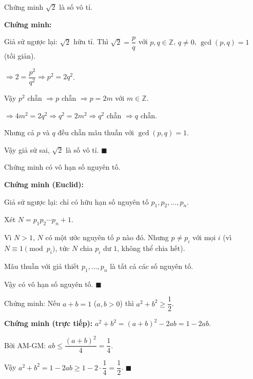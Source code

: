 \documentclass[12pt,a4paper]{article}
\begin{document}
\begin{vidu}[title={$\sqrt{2}$ là số vô tỉ}]
  Chứng minh $\sqrt{2}$ là số vô tỉ.

  \medskip\textbf{Chứng minh:}

  Giả sử ngược lại: $\sqrt{2}$ hữu tỉ. Thì $\sqrt{2} = \dfrac{p}{q}$ với $p, q \in \mathbb{Z}$, $q \ne 0$, $\gcd(p,q) = 1$ (tối giản).

  $\Rightarrow 2 = \dfrac{p^2}{q^2} \Rightarrow p^2 = 2q^2$.

  Vậy $p^2$ chẵn $\Rightarrow p$ chẵn $\Rightarrow p = 2m$ với $m \in \mathbb{Z}$.

  $\Rightarrow 4m^2 = 2q^2 \Rightarrow q^2 = 2m^2 \Rightarrow q^2$ chẵn $\Rightarrow q$ chẵn.

  Nhưng cả $p$ và $q$ đều chẵn mâu thuẫn với $\gcd(p,q) = 1$.

  Vậy giả sử sai, $\sqrt{2}$ là số vô tỉ. $\blacksquare$
\end{vidu}

\begin{vidu}[title={Có vô hạn số nguyên tố}]
  Chứng minh có vô hạn số nguyên tố.

  \medskip\textbf{Chứng minh (Euclid):}

  Giả sử ngược lại: chỉ có hữu hạn số nguyên tố $p_1, p_2, \ldots, p_n$.

  Xét $N = p_1 p_2 \cdots p_n + 1$.

  Vì $N > 1$, $N$ có một ước nguyên tố $p$ nào đó. Nhưng $p \ne p_i$ với mọi $i$ (vì $N \equiv 1 \pmod{p_i}$, tức $N$ chia $p_i$ dư $1$, không thể chia hết).

  Mâu thuẫn với giả thiết $p_1, \ldots, p_n$ là tất cả các số nguyên tố.

  Vậy có vô hạn số nguyên tố. $\blacksquare$
\end{vidu}

\begin{vidu}[title={Chứng minh bất phương trình}]
  Chứng minh: Nếu $a + b = 1$ ($a, b > 0$) thì $a^2 + b^2 \ge \dfrac{1}{2}$.

  \medskip\textbf{Chứng minh (trực tiếp):}
  $a^2 + b^2 = (a+b)^2 - 2ab = 1 - 2ab$.

  Bởi AM-GM: $ab \le \dfrac{(a+b)^2}{4} = \dfrac{1}{4}$.

  Vậy $a^2 + b^2 = 1 - 2ab \ge 1 - 2 \cdot \dfrac{1}{4} = \dfrac{1}{2}$. $\blacksquare$
\end{vidu}

\end{document}
